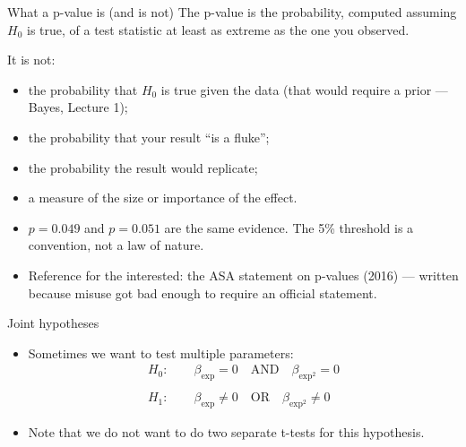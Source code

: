 \documentclass[aspectratio=169,11pt]{beamer}
\begin{document}
\begin{frame}{What a p-value is (and is not)}
The \alert{p-value} is the probability, \alert{computed assuming $H_0$ is true}, of a
test statistic at least as extreme as the one you observed.
\bigskip

It is \alert{not}:
\begin{itemize}
	\item the probability that $H_0$ is true given the data (that would require a prior --- Bayes, Lecture 1);
	\item the probability that your result ``is a fluke'';
	\item the probability the result would replicate;
	\item a measure of the \alert{size} or \alert{importance} of the effect.
\end{itemize}
\bigskip
\begin{itemize}
	\item $p = 0.049$ and $p = 0.051$ are the same evidence. The 5\% threshold is a
	convention, not a law of nature.
	\item Reference for the interested: the ASA statement on p-values (2016) ---
	written because misuse got bad enough to require an official statement.
\end{itemize}
\end{frame}



\begin{frame}{Joint hypotheses}
\begin{itemize}
	\item Sometimes we want to test multiple parameters:\[
\begin{array}{c}
H_{0}:\qquad\beta_{\text{exp}}=0\quad\text{AND}\quad\beta_{\text{exp}^2}=0\\
\\
H_{1}:\qquad\beta_{\text{exp}}\ne0\quad\text{OR}\quad\beta_{\text{exp}^2}\ne0
\end{array}
\]

	\item Note that we do not want to do two separate t-tests for this hypothesis. 
\end{itemize}
\end{frame}
\end{document}
